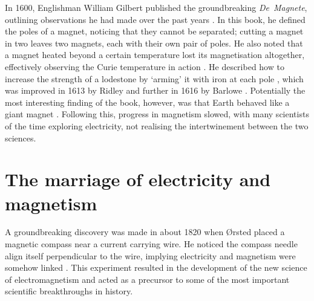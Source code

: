 In 1600, Englishman William Gilbert published the groundbreaking \textit{De~Magnete}, outlining observations he had made over the past years \cite{Stohr2006,Mills2004,Hafeli1997,Mattis1981,Coey2010,Stoner1934,Morrish1965,Lacheisserie2005}. In this book, he defined the poles of a magnet, noticing that they cannot be separated; cutting a magnet in two leaves two magnets, each with their own pair of poles. He also noted that a magnet heated beyond a certain temperature lost its magnetisation altogether, effectively observing the Curie temperature in action \cite{Mills2004}. He described how to increase the strength of a lodestone by `arming' it with iron at each pole \cite{Mills2004,Hafeli1997}, which was improved in 1613 by Ridley and further in 1616 by Barlowe \cite{Mills2004}. Potentially the most interesting finding of the book, however, was that Earth behaved like a giant magnet \cite{Mills2004,Stohr2006,Mattis1981,Coey2010,Stoner1934}. Following this, progress in magnetism slowed, with many scientists of the time exploring electricity, not realising the intertwinement between the two sciences.

\section*{The marriage of electricity and magnetism}
A groundbreaking discovery was made in about 1820 when \O{}rsted placed a magnetic compass near a current carrying wire. He noticed the compass needle align itself perpendicular to the wire, implying electricity and magnetism were somehow linked \cite{Stohr2006,Hafeli1997,Coey2010,Selvan2007,Stoner1934,Lacheisserie2005}. This experiment resulted in the development of the new science of electromagnetism and acted as a precursor to some of the most important scientific breakthroughs in history.

